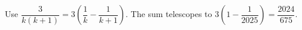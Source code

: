 Use $\dfrac{3}{k(k+1)}=3\left(\dfrac{1}{k}-\dfrac{1}{k+1}\right)$. The sum telescopes to $3\left(1-\dfrac{1}{2025}\right)=\boxed{\dfrac{2024}{675}}$.
